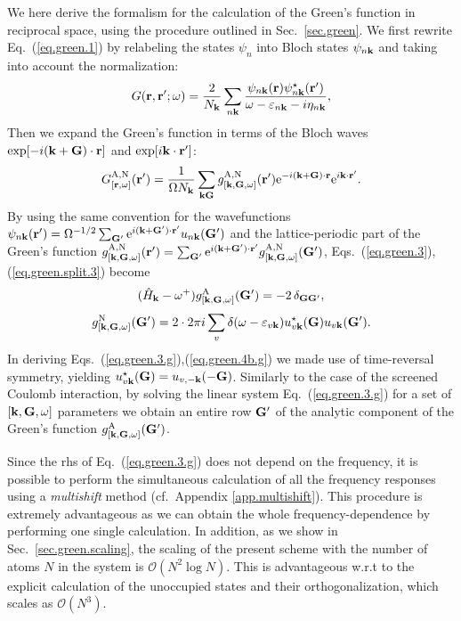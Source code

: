 \documentclass[twocolumn,prb,showpacs,superscriptaddress]{revtex4}
\def\w{\omega}
\def\H{\hat{H}}
\def\E{\varepsilon}
\def\k{{\bf k}}
\def\G{{\bf G}}
\def\Gp{{\bf G^\prime}}
\def\r{{\bf r}}
\def\rp{{\bf r^\prime}}
\begin{document}
We here derive the formalism for the calculation of the Green's function
in reciprocal space, using the procedure outlined in Sec.\ \ref{sec.green}.
We first rewrite Eq.\ (\ref{eq.green.1}) by relabeling the states
$\psi_n$ into Bloch states $\psi_{n\k}$ and taking into account the
normalization:
  \begin{equation}\label{eq.green.1.g}
  G(\r,\rp;\w) = \frac{2}{N_\k}\sum_{n\k} \frac{\psi_{n\k}(\r)\psi_{n\k}^\star(\rp)}{\w-\E_{n\k}-i\eta_{n\k}},
  \end{equation}
Then we expand the Green's function in terms
of the Bloch waves ${\rm exp}[-i(\k+\G)\cdot\r]$ and ${\rm exp}[i\k\cdot\rp]$:
  \begin{equation}\label{eq.green.bloch}
  G^{\rm A,N}_{[\r,\w]} (\rp) = \frac{1}{\Omega N_\k}  \sum_{\k\G} g^{\rm A,N}_{[\k,\G,\w]}(\rp)
   {\rm e}^{-i(\k+\G)\cdot\r} {\rm e}^{i\k\cdot\rp}.
  \end{equation}
By using the same convention for the wavefunctions 
$\psi_{n\k}(\rp)=\Omega^{-1/2}\sum_\Gp {\rm e}^{i(\k+\Gp)\cdot\rp} u_{n\k}(\Gp)$
and the lattice-periodic part of the Green's function 
$g^{\rm A,N}_{[\k,\G,\w]}(\rp)  = \sum_\Gp {\rm e}^{i(\k+\Gp)\cdot\rp} g^{\rm A,N}_{[\k,\G,\w]}(\Gp)$,
Eqs.~(\ref{eq.green.3}),(\ref{eq.green.split.3}) become
  \begin{equation}\label{eq.green.3.g}
   (\H_\k-\w^+)  g^{\rm A}_{[\k,\G,\w]}(\Gp)  =  -2 \,\delta_{\G\Gp},
  \end{equation}
  \begin{equation} \label{eq.green.4b.g}
  g^{\rm N}_{[\k,\G,\w]}(\Gp)  =  
  2 \cdot 2\pi i \sum_v \delta(\w-\E_{v\k}) u^\star_{v\k}(\G)u_{v\k} (\Gp).
  \end{equation}
In deriving Eqs.\ (\ref{eq.green.3.g}),(\ref{eq.green.4b.g}) we made use of time-reversal symmetry, yielding
$u^\star_{v\k}(\G) = u_{v,-\k}(-\G)$.
Similarly to the case of the screened Coulomb interaction, by solving the
linear system Eq.\ (\ref{eq.green.3.g}) for a set of $[\k,\G,\w]$ parameters
we obtain an entire row $\Gp$ of the analytic component of the
Green's function $g^{\rm A}_{[\k,\G,\w]}(\Gp)$.

Since the rhs of Eq.\ (\ref{eq.green.3.g}) does not depend on the frequency, 
it is possible to perform the simultaneous calculation of all the frequency responses 
using a {\it multishift} method (cf.\ Appendix \ref{app.multishift}). This procedure is extremely
advantageous as we can obtain the whole frequency-dependence by performing one
single calculation. In addition, as we show in Sec.\ \ref{sec.green.scaling},
the scaling of the present scheme with the number of atoms $N$ in the system 
is ${\mathcal O}(N^2\log N)$. This is advantageous w.r.t to the explicit calculation 
of the unoccupied states and their orthogonalization, which scales as ${\mathcal O}(N^3)$.
\end{document}
